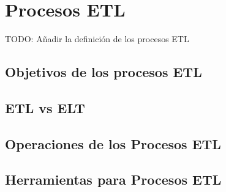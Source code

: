 \section{Procesos ETL}\label{section:etl}
TODO: A\~nadir la definici\'on de los procesos ETL
\subsection{Objetivos de los procesos ETL}
\subsection{ETL vs ELT}
\subsection{Operaciones de los Procesos ETL}
\subsection{Herramientas para Procesos ETL}
